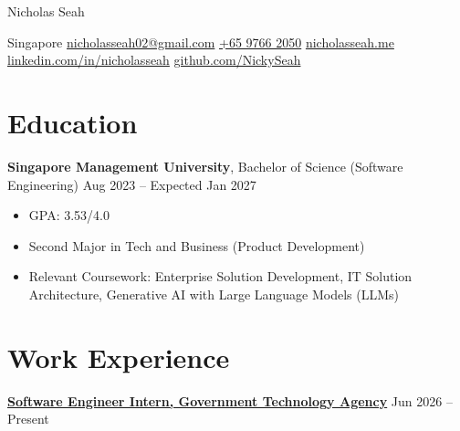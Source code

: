 \documentclass[10pt, a4paper]{article}
\newenvironment{resumeitemize}{
    \begin{itemize}[
        leftmargin=1.15em,
        itemsep=0.12em,
        topsep=0.12em,
        parsep=0.04em,
        partopsep=0pt
    ]
}{
    \end{itemize}
}
\begin{document}
\begin{center}
    {\LARGE Nicholas Seah\par}
    \vspace{0.3em}
    Singapore \textbar{} \href{mailto:nicholasseah02@gmail.com}{nicholasseah02@gmail.com} \textbar{} \href{tel:+6597662050}{+65 9766 2050} \textbar{} \href{https://www.nicholasseah.me/}{nicholasseah.me} \break \href{https://linkedin.com/in/nicholasseah}{linkedin.com/in/nicholasseah} \textbar{} \href{https://github.com/NickySeah}{github.com/NickySeah}
\end{center}


\vspace{0.10em}

\section{Education}

\textbf{Singapore Management University}, Bachelor of Science (Software Engineering) \hfill Aug 2023 -- Expected Jan 2027

\begin{resumeitemize}
    \item GPA: 3.53/4.0
    \item Second Major in Tech and Business (Product Development)
    \item Relevant Coursework: Enterprise Solution Development, IT Solution Architecture, Generative AI with Large Language Models (LLMs)
\end{resumeitemize}

\section{Work Experience}

\href{https://www.tech.gov.sg/}{\textbf{Software Engineer Intern, Government Technology Agency}} \hfill Jun 2026 -- Present
\end{document}
